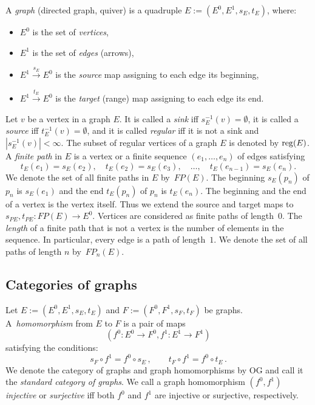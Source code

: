\documentclass[12pt,times,a4paper]{amsart}
\numberwithin{equation}{section}
\numberwithin{equation}{section}
\begin{document}
A {\em graph} (directed graph, quiver) is a quadruple $E:=(E^0,E^1,s_E,t_E)$, where:
\begin{itemize}
\item $E^0$ is the set of {\em vertices},
\item $E^1$ is the set of {\em edges} (arrows),
\item $E^1\overset{s_E}{\to}E^0$ is the {\em source} map assigning to each edge its beginning,
\item $E^1\overset{t_E}{\to}E^0$ is the {\em target} (range) map assigning to each edge its end.
\end{itemize}

Let $v$ be a vertex in a graph $E$. It is called a {\em sink} iff $s_E^{-1}(v)=\emptyset$, it is called a {\em source} iff $t_E^{-1}(v)=\emptyset$, and it is called {\em regular} iff it is not a sink and $|s_E^{-1}(v)|<\infty$. The subset of regular vertices 
of a graph $E$ is denoted by ${\rm reg}(E)$. A {\em finite path} in $E$ is a vertex or a finite sequence $(e_1,\ldots,e_n)$ of edges 
satisfying 
\begin{equation}
t_E(e_1)=s_E(e_2),\quad t_E(e_2)=s_E(e_3),\quad \ldots,\quad t_E(e_{n-1})=s_E(e_n).
\end{equation} 
We denote the set of all finite paths in $E$ by~$FP(E)$. The beginning $s_E(p_n)$ of $p_n$ is $s_E(e_1)$ and the end $t_E(p_n)$ of 
$p_n$ is $t_E(e_n)$. The beginning and the end of a vertex is the vertex itself. Thus we extend the source and target maps to 
$s_{PE},t_{PE}\colon FP(E)\to E^0$. Vertices are considered as finite paths of length~$0$. The {\em length} of a finite path that is 
not a vertex is the number of elements in the sequence. In particular, every edge is a path of length~$1$. We denote the set of all paths of length $n$ 
by~$FP_n(E)$.


\subsection{Categories of graphs}

Let $E:=(E^0,E^1,s_E,t_E)$ and $F:=(F^0,F^1,s_F,t_F)$ be graphs. A~{\em homomorphism} from $E$ to $F$ is a pair of maps 
\begin{equation}
(f^0:E^0\to F^0,f^1:E^1\to F^1)
\end{equation} 
satisfying the conditions:
\begin{equation} \label{graphom}
s_F\circ f^1=f^0\circ s_E\,,\qquad t_F\circ f^1=f^0\circ t_E\,.
\end{equation}
We denote the category of graphs and graph homomorphisms by {\rm OG} and call it the {\em standard category of graphs}.
We call a graph homomorphism $(f^0,f^1)$ \emph{injective} or \emph{surjective} iff both $f^0$ and $f^1$ are injective or 
surjective, respectively.
\end{document}

